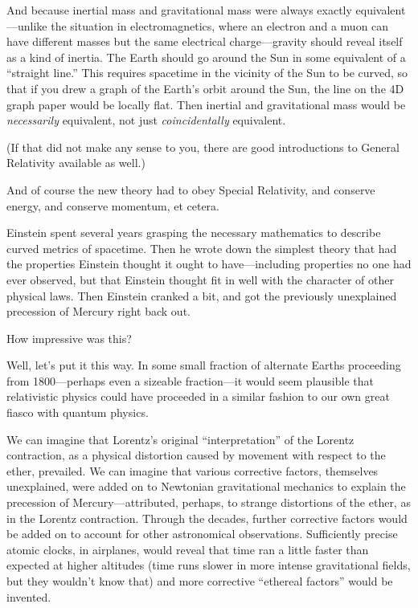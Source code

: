 {
 And because inertial mass and gravitational mass were always
exactly equivalent---unlike the situation in electromagnetics, where an
electron and a muon can have different masses but the same electrical
charge---gravity should reveal itself as a kind of inertia. The Earth
should go around the Sun in some equivalent of a
``straight line.'' This requires
spacetime in the vicinity of the Sun to be curved, so that if you drew
a graph of the Earth's orbit around the Sun, the line
on the 4D graph paper would be locally flat. Then inertial and
gravitational mass would be \textit{necessarily} equivalent, not just
\textit{coincidentally} equivalent.}

{
 (If that did not make any sense to you, there are good
introductions to General Relativity available as well.)}

{
 And of course the new theory had to obey Special Relativity, and
conserve energy, and conserve momentum, et cetera.}

{
 Einstein spent several years grasping the necessary mathematics to
describe curved metrics of spacetime. Then he wrote down the simplest
theory that had the properties Einstein thought it ought to
have---including properties no one had ever observed, but that Einstein
thought fit in well with the character of other physical laws. Then
Einstein cranked a bit, and got the previously unexplained precession
of Mercury right back out.}

{
 How impressive was this?}

{
 Well, let's put it this way. In some small
fraction of alternate Earths proceeding from 1800---perhaps even a
sizeable fraction---it would seem plausible that relativistic physics
could have proceeded in a similar fashion to our own great fiasco with
quantum physics.}

{
 We can imagine that Lorentz's original
``interpretation'' of the Lorentz
contraction, as a physical distortion caused by movement with respect
to the ether, prevailed. We can imagine that various corrective
factors, themselves unexplained, were added on to Newtonian
gravitational mechanics to explain the precession of
Mercury---attributed, perhaps, to strange distortions of the ether, as
in the Lorentz contraction. Through the decades, further corrective
factors would be added on to account for other astronomical
observations. Sufficiently precise atomic clocks, in airplanes, would
reveal that time ran a little faster than expected at higher altitudes
(time runs slower in more intense gravitational fields, but they
wouldn't know that) and more corrective
``ethereal factors'' would be
invented.}

